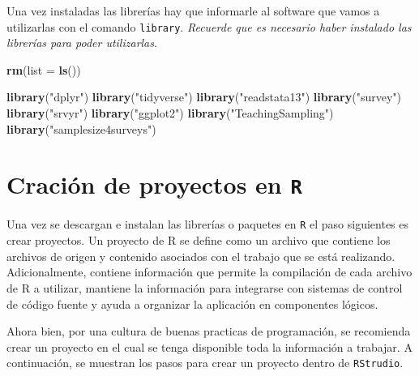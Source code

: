 \documentclass[
  12pt,
]{book}
\newenvironment{Shaded}{\begin{snugshade}}{\end{snugshade}}
\newcommand{\AttributeTok}[1]{\textcolor[rgb]{0.13,0.29,0.53}{#1}}
\newcommand{\FunctionTok}[1]{\textcolor[rgb]{0.13,0.29,0.53}{\textbf{#1}}}
\newcommand{\NormalTok}[1]{#1}
\newcommand{\StringTok}[1]{\textcolor[rgb]{0.31,0.60,0.02}{#1}}
\begin{document}
Una vez instaladas las librerías hay que informarle al software que vamos a utilizarlas con el comando \texttt{library}. \emph{Recuerde que es necesario haber instalado las librerías para poder utilizarlas}.

\begin{Shaded}
\begin{Highlighting}[]
\FunctionTok{rm}\NormalTok{(}\AttributeTok{list =} \FunctionTok{ls}\NormalTok{())}

\FunctionTok{library}\NormalTok{(}\StringTok{"dplyr"}\NormalTok{)}
\FunctionTok{library}\NormalTok{(}\StringTok{"tidyverse"}\NormalTok{)}
\FunctionTok{library}\NormalTok{(}\StringTok{"readstata13"}\NormalTok{) }
\FunctionTok{library}\NormalTok{(}\StringTok{"survey"}\NormalTok{)}
\FunctionTok{library}\NormalTok{(}\StringTok{"srvyr"}\NormalTok{)}
\FunctionTok{library}\NormalTok{(}\StringTok{"ggplot2"}\NormalTok{)}
\FunctionTok{library}\NormalTok{(}\StringTok{"TeachingSampling"}\NormalTok{)}
\FunctionTok{library}\NormalTok{(}\StringTok{"samplesize4surveys"}\NormalTok{)}
\end{Highlighting}
\end{Shaded}

\section{\texorpdfstring{Cración de proyectos en \texttt{R}}{Cración de proyectos en R}}\label{craciuxf3n-de-proyectos-en-r}

Una vez se descargan e instalan las librerías o paquetes en \texttt{R} el paso siguientes es crear proyectos. Un proyecto de R se define como un archivo que contiene los archivos de origen y contenido asociados con el trabajo que se está realizando. Adicionalmente, contiene información que permite la compilación de cada archivo de R a utilizar, mantiene la información para integrarse con sistemas de control de código fuente y ayuda a organizar la aplicación en componentes lógicos.

Ahora bien, por una cultura de buenas practicas de programación, se recomienda crear un proyecto en el cual se tenga disponible toda la información a trabajar. A continuación, se muestran los pasos para crear un proyecto dentro de \texttt{RStrudio}.
\end{document}
